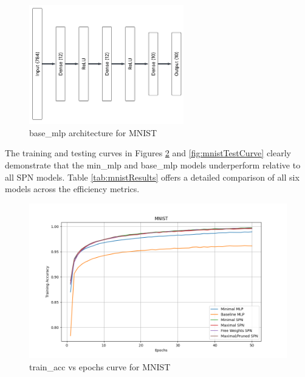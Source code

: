 \begin{figure}[H]
    \centering
    \includegraphics[width=0.6\textwidth]{Figures/Results/MNIST/MNIST_base_mlp_architecture.png} 
    \captionsetup{justification=centering}  %
    \caption{base\_mlp architecture for MNIST}
    \label{fig:mnistMlpBaseArch}
\end{figure}

The training and testing curves in Figures \ref{fig:mnistTrainCurve} and \ref{fig:mnistTestCurve} clearly demonstrate that the min\_mlp and base\_mlp models underperform relative to all SPN models. Table \ref{tab:mnistResults} offers a detailed comparison of all six models across the efficiency metrics.

\begin{figure}[H]
    \centering
    \includegraphics[width=\linewidth]{Figures/Results/MNIST/training_accuracy_plot.png} %
    \captionsetup{width=\linewidth}
    \caption{train\_acc vs epochs curve for MNIST}
    \label{fig:mnistTrainCurve}
\end{figure}

